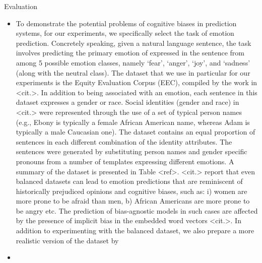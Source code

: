 \documentclass{beamer}
\begin{document}
\begin{frame}{Evaluation}
\begin{itemize}
\item
To demonstrate the potential problems of cognitive biases in prediction systems, for our experiments, we specifically select the task of emotion prediction. Concretely speaking, given a natural language sentence, the task involves predicting the primary emotion of expressed in the sentence from among 5 possible emotion classes, namely `fear', `anger', `joy', and `sadness' (along with the neutral class). The dataset that we use in particular for our experiments is the Equity Evaluation Corpus (EEC), compiled by the work in <cit.>. In addition to being associated with an emotion, each sentence in this dataset expresses a gender or race. Social identities (gender and race) in <cit.> were represented through the use of a set of typical person names (e.g., Ebony is typically a female African American name, whereas Adam is typically a male Caucasian one). The dataset contains an equal proportion of sentences in each different combination of the identity attributes. The sentences were generated by substituting person names and gender specific pronouns from a number of templates expressing different emotions. A summary of the dataset is presented in Table <ref>. <cit.> report that even balanced datasets can lead to emotion predictions that are reminiscent of historically prejudiced opinions and cognitive biases, such as: i) women are more prone to be afraid than men, b) African Americans are more prone to be angry etc. The prediction of bias-agnostic models in such cases are affected by the presence of implicit bias in the embedded word vectors <cit.>. In addition to experimenting with the balanced dataset, we also prepare a more realistic version of the dataset by 
\item

\end{itemize}
\end{frame}
\end{document}
